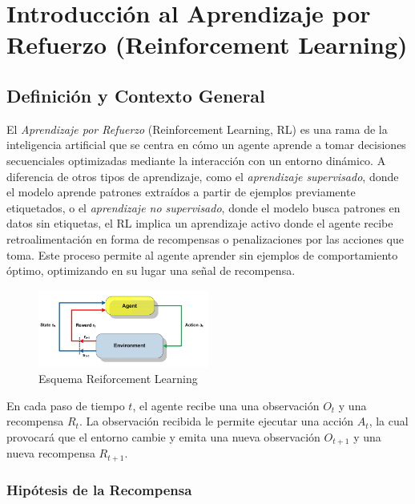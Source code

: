 \documentclass[a4paper,12pt, twoside]{report}
\begin{document}
\section{Introducción al Aprendizaje por Refuerzo (Reinforcement Learning)}

\subsection{Definición y Contexto General}

El \textit{Aprendizaje por Refuerzo} (Reinforcement Learning, RL) es una rama de la inteligencia 
artificial que se centra en cómo un agente aprende a tomar decisiones secuenciales optimizadas 
mediante la interacción con un entorno dinámico. A diferencia de otros tipos de aprendizaje, como 
el \textit{aprendizaje supervisado}, donde el modelo aprende patrones extraídos a partir de ejemplos 
previamente etiquetados, o el \textit{aprendizaje no supervisado}, donde el modelo busca patrones 
en datos sin etiquetas, el RL implica un aprendizaje activo donde el agente recibe retroalimentación 
en forma de recompensas o penalizaciones por las acciones que toma. Este proceso permite al 
agente aprender sin ejemplos de comportamiento óptimo, optimizando en su lugar una señal de recompensa.

\begin{figure}[H]
    \centering
    \includegraphics[width=0.5\textwidth]{./figures/A-brief-schema-of-Reinforcement-Learning-26.png}
    \caption{Esquema Reiforcement Learning}
    \label{fig:RF-schema}
\end{figure}

En cada paso de tiempo \(t\), el agente recibe una una observación \(O_t\) y una recompensa \(R_t\).
La observación recibida le permite ejecutar una acción \(A_t\), la cual provocará que el entorno cambie
y emita una nueva observación \(O_{t+1}\) y una nueva recompensa \(R_{t+1}\).

\subsubsection{Hipótesis de la Recompensa}
\end{document}
